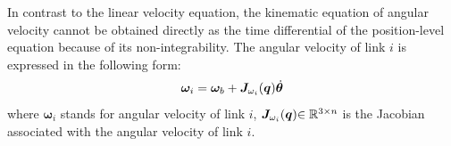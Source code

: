 In contrast to the linear velocity equation,
the kinematic equation of angular velocity cannot be obtained directly
as the time differential of the position-level equation because of its non-integrability.
The angular velocity of link $i$ is expressed in the following form:
%
\begin{align}
  \bm{\omega}_{i} = \bm{\omega}_{b} + \bm{J}_{\omega_{i}}(\bm{q}){\dot{\bm{\theta}}}\label{eq:ANGVEL_LINKi}
\end{align}
%
where $\bm{\omega}_{i}$ stands for angular velocity of link $i$,
$\bm{J}_{\omega_{i}}(\bm{q}){\in\mathbb{R}^{3 \times n}}$ is the Jacobian associated with the angular velocity of link $i$.




